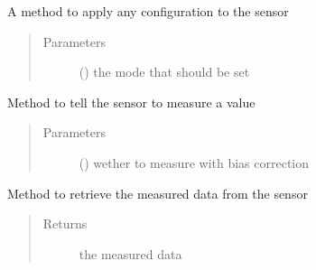 \documentclass[letterpaper,10pt,english]{sphinxmanual}
\begin{document}
\begin{fulllineitems}

\begin{fulllineitems}
\label{\detokenize{sensor:lib.sensor.SensorInterface.configure}}
A method to apply any configuration to the sensor
\begin{quote}\begin{description}
\item[{Parameters}] \leavevmode
{} () \textendash{} the mode that should be set

\end{description}\end{quote}

\end{fulllineitems}


\begin{fulllineitems}
\label{\detokenize{sensor:lib.sensor.SensorInterface.measure}}
Method to tell the sensor to measure a value
\begin{quote}\begin{description}
\item[{Parameters}] \leavevmode
{} () \textendash{} wether to measure with bias correction

\end{description}\end{quote}

\end{fulllineitems}


\begin{fulllineitems}
\label{\detokenize{sensor:lib.sensor.SensorInterface.read_measurements}}
Method to retrieve the measured data from the sensor
\begin{quote}\begin{description}
\item[{Returns}] \leavevmode
the measured data


\end{description}
\end{quote}
\end{fulllineitems}
\end{fulllineitems}
\end{document}
